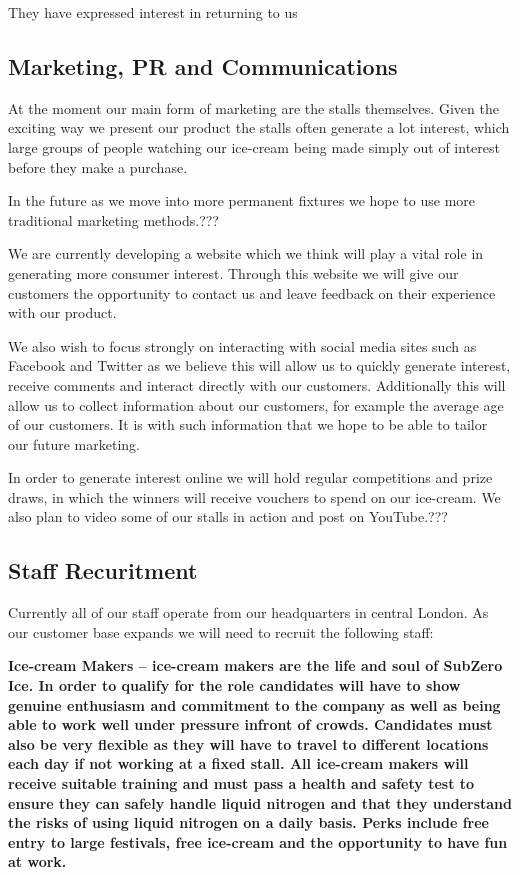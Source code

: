 \documentclass{article}
\begin{document}
  They have expressed interest in returning to us

  \subsection{Marketing, PR and Communications}
  At the moment our main form of marketing are the stalls themselves.
Given the exciting way we present our product the stalls often generate
a lot interest, which large groups of people watching our ice-cream
being made simply out of interest before they make a purchase.

In the future as we move into more permanent fixtures we hope to use
more traditional marketing methods.???

We are currently developing a website which we think will play a vital
role in generating more consumer interest. Through this website we will
give our customers the opportunity to contact us and leave feedback on
their experience with our product.

We also wish to focus strongly on interacting with social media sites
such as Facebook and Twitter as we believe this will allow us to quickly
generate interest, receive comments and interact directly with our
customers. Additionally this will allow us to collect information about
our customers, for example the average age of our customers. It is with
such information that we hope to be able to tailor our future marketing.

In order to generate interest online we will hold regular competitions
and prize draws, in which the winners will receive vouchers to spend on
our ice-cream. We also plan to video some of our stalls in action and
post on YouTube.???

  \subsection{Staff Recuritment}

  Currently all of our staff operate from our headquarters in central London. As our customer base expands we will need to recruit the following staff:

 \bf{Ice-cream Makers} – ice-cream makers are the life and soul of SubZero Ice. In order to qualify for the role candidates will have to show genuine enthusiasm and commitment to the company as well as being able to work well under pressure infront of crowds. Candidates must also be very flexible as they will have to travel to different locations each day if not working at a fixed stall. All ice-cream makers will receive suitable training and must pass a health and safety test to ensure they can safely handle liquid nitrogen and that they understand the risks of using liquid nitrogen on a daily basis. Perks include free entry to large festivals, free ice-cream and the opportunity to have fun at work.
\end{document}
